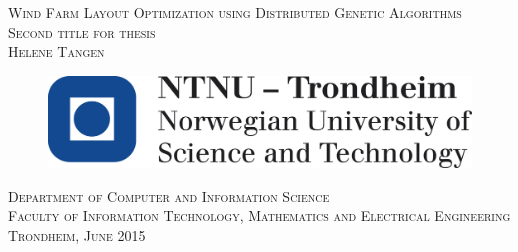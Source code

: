 \begin{titlepage}
 \vspace*{\fill}
    \begin{center}
      {\Huge \scshape \Large Wind Farm Layout Optimization using Distributed Genetic Algorithms\\ \normalsize Second title for thesis}\\[0.5cm]
      {      \scshape Helene Tangen }
     \end{center}
	\vspace*{3cm}
    \begin{figure}[h!]
    \centering
    \includegraphics[scale=0.3]{logo_ntnu_eng}
    \end{figure}
    \begin{center}
    \scshape Department of Computer and Information Science \\
    \scshape Faculty of Information Technology, Mathematics and Electrical Engineering\\
  	\normalfont Trondheim, June 2015
    \end{center}
   \vspace*{\fill}

\end{titlepage}
